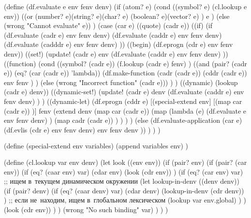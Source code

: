 \begin{code:lisp}
(define (df.evaluate e env fenv denv)
  (if (atom? e)
      (cond ((symbol? e) (cl.lookup e env))
            ((or (number? e)(string? e)(char? e)
                 (boolean? e)(vector? e) )
             e )
            (else (wrong "Cannot evaluate" e)) )
      (case (car e)
        ((quote)  (cadr e))
        ((if)     (if (df.evaluate (cadr e) env fenv denv)
                      (df.evaluate (caddr e) env fenv denv)
                      (df.evaluate (cadddr e) env fenv denv) ))
        ((begin)  (df.eprogn (cdr e) env fenv denv))
        ((set!)   (update! (cadr e)
                           env
                           (df.evaluate (caddr e) env fenv denv) ))
        ((function)
         (cond ((symbol? (cadr e))
                (f.lookup (cadr e) fenv) )
               ((and (pair? (cadr e)) (eq? (car (cadr e)) 'lambda))
                (df.make-function
                 (cadr (cadr e)) (cddr (cadr e)) env fenv ) )
               (else (wrong "Incorrect function" (cadr e))) ) )
        ((dynamic) (lookup (cadr e) denv))
        ((dynamic-set!)
         (update! (cadr e)
                  denv
                  (df.evaluate (caddr e) env fenv denv) ) )
        ((dynamic-let)
         (df.eprogn (cddr e)
                    [(special-extend env]
                                    [(map car (cadr e)) )]
                    fenv
                    (extend denv
                            (map car (cadr e))
                            (map (lambda (e)
                                   (df.evaluate e env fenv denv) )
                                 (map cadr (cadr e)) ) ) ) )
        (else (df.evaluate-application (car e)
                                       (df.evlis (cdr e) env fenv denv)
                                       env
                                       fenv
                                       denv )) ) ) )

(define (special-extend env variables)
  (append variables env) )

(define (cl.lookup var env denv)
  (let look ((env env))
    (if (pair? env)
        (if (pair? (car env))
            (if (eq? (caar env) var)
                (cdar env)
                (look (cdr env)) )
            (if (eq? (car env) var)
                ;; ищем в~текущем динамическом окружении
                (let lookup-in-denv ((denv denv))
                  (if (pair? denv)
                      (if (eq? (caar denv) var)
                          (cdar denv)
                          (lookup-in-denv (cdr denv)) )
                      ;; если не~находим, ищем в~глобальном лексическом
                      (lookup var env.global) ) )
                (look (cdr env)) ) )
        (wrong "No such binding" var) ) ) )
\end{code:lisp}


